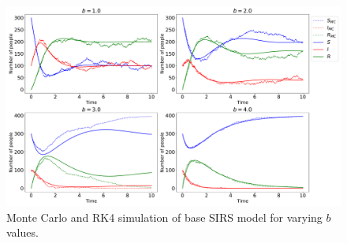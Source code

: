\documentclass[../main.tex]{subfiles}
\begin{document}
\begin{figure}[!htb]
\centering
\includegraphics[width=\textwidth]{../figures/rk4_vs_mc_base.pdf}
\caption{Monte Carlo  and RK4 simulation of base SIRS model for varying $b$ values.}
\label{fig:mc:base}
\end{figure}

\newpage

\end{document}
